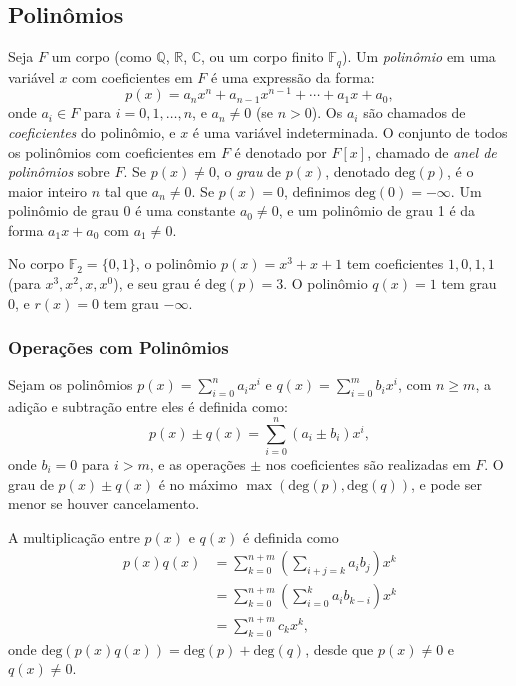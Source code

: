 \subsection{Polinômios}

\begin{definition}
  Seja $F$ um corpo (como $\mathbb{Q}$, $\mathbb{R}$, $\mathbb{C}$, ou um corpo
  finito $\mathbb{F}_q$). Um \emph{polinômio} em uma variável $x$ com
  coeficientes em $F$ é uma expressão da forma:
  \begin{equation}\label{def:polinomio}
  p(x) = a_n x^n + a_{n-1} x^{n-1} + \cdots + a_1 x + a_0,
  \end{equation}
  onde $a_i \in F$ para $i = 0, 1, \ldots, n$, e $a_n \neq 0$ (se $n > 0$). Os
  $a_i$ são chamados de \emph{coeficientes} do polinômio, e $x$ é uma variável
  indeterminada. O conjunto de todos os polinômios com coeficientes em $F$ é
  denotado por $F[x]$, chamado de \emph{anel de polinômios} sobre $F$. Se $p(x)
  \neq 0$, o \emph{grau} de $p(x)$, denotado $\text{deg}(p)$, é o maior inteiro
  $n$ tal que $a_n \neq 0$. Se $p(x) = 0$, definimos $\text{deg}(0) = -\infty$.
  Um polinômio de grau 0 é uma constante $a_0 \neq 0$, e um polinômio de grau 1
  é da forma $a_1 x + a_0$ com $a_1 \neq 0$.
\end{definition}

\begin{example}
  No corpo $\mathbb{F}_2 = \{0, 1\}$, o polinômio $p(x) = x^3 + x + 1$ tem
  coeficientes $1, 0, 1, 1$ (para $x^3, x^2, x, x^0$), e seu grau é
  $\text{deg}(p) = 3$. O polinômio $q(x) = 1$ tem grau 0, e $r(x) = 0$ tem grau
  $-\infty$.
\end{example}

\subsubsection{Operações com Polinômios}

Sejam os polinômios $p(x) = \sum_{i=0}^n a_i x^i$ e $q(x) = \sum_{i=0}^m b_i x^i$, com $n \geq m$,
a adição e subtração entre eles é definida como:
\begin{equation}
  p(x) \pm q(x) = \sum_{i=0}^n (a_i \pm b_i) x^i,
\end{equation}
onde $b_i = 0$ para $i > m$, e as operações $\pm$ nos coeficientes são
realizadas em $F$. O grau de $p(x) \pm q(x)$ é no máximo $\max(\text{deg}(p),\text{deg}(q))$,
e pode ser menor se houver cancelamento.

A multiplicação entre $p(x)$ e $q(x)$ é definida como
\begin{subequations}
  \begin{align}
    p(x) q(x) &= \sum_{k=0}^{n+m} \left( \sum_{i+j=k} a_i b_j \right) x^k \\
    &= \sum_{k=0}^{n+m} \left( \sum_{i=0}^k a_i b_{k-i} \right) x^k \\
    &= \sum_{k=0}^{n+m} c_k x^k, 
  \end{align}
\end{subequations}
onde $\text{deg}(p(x) q(x)) = \text{deg}(p) + \text{deg}(q)$, desde que 
$p(x) \neq 0$ e $q(x) \neq 0$.

